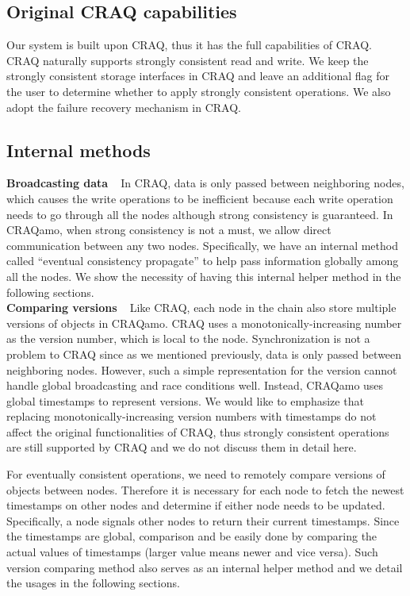 \subsection{Original CRAQ capabilities}
Our system is built upon CRAQ, thus it has the full capabilities of CRAQ. CRAQ naturally supports strongly consistent read and write. We keep the strongly consistent storage interfaces in CRAQ and leave an additional flag for the user to determine whether to apply strongly consistent operations. We also adopt the failure recovery mechanism in CRAQ.

\subsection{Internal methods}
{\noindent \bf Broadcasting data\ \ }In CRAQ, data is only passed between neighboring nodes, which causes the write operations to be inefficient because each write operation needs to go through all the nodes although strong consistency is guaranteed. In CRAQamo, when strong consistency is not a must, we allow direct communication between any two nodes. Specifically, we have an internal method called ``eventual consistency propagate'' to help pass information globally among all the nodes. We show the necessity of having this internal helper method in the following sections. \\

{\noindent \bf Comparing versions\ \ }Like CRAQ, each node in the chain also store multiple versions of objects in CRAQamo. CRAQ uses a monotonically-increasing number as the version number, which is local to the node. Synchronization is not a problem to CRAQ since as we mentioned previously, data is only passed between neighboring nodes. However, such a simple representation for the version cannot handle global broadcasting and race conditions well. Instead, CRAQamo uses global timestamps to represent versions. We would like to emphasize that replacing monotonically-increasing version numbers with timestamps do not affect the original functionalities of CRAQ, thus strongly consistent operations are still supported by CRAQ and we do not discuss them in detail here.

For eventually consistent operations, we need to remotely compare versions of objects between nodes. Therefore it is necessary for each node to fetch the newest timestamps on other nodes and determine if either node needs to be updated. Specifically, a node signals other nodes to return their current timestamps. Since the timestamps are global, comparison and be easily done by comparing the actual values of timestamps (larger value means newer and vice versa). Such version comparing method also serves as an internal helper method and we detail the usages in the following sections. 

